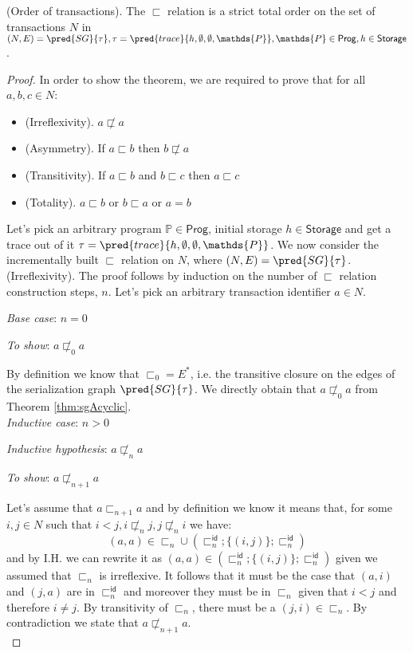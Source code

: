 \begin{thm}
	\label{thm:totOrder}
	(Order of transactions).
	The $\sqsubset$ relation is a strict total order on the set of transactions $N$ in $(N, E) = \pred{SG}{\tau}, \tau = \pred{trace}{h, \emptyset, \emptyset, \mathds{P}}, \mathds{P} \in \mathsf{Prog}, h \in \mathsf{Storage}$.

	\begin{proof}
	In order to show the theorem, we are required to prove that for all $a, b, c \in N$:
	\begin{itemize}
		\item (Irreflexivity). $a \not\sqsubset a$
		\item (Asymmetry). If $a \sqsubset b$ then $b \not\sqsubset a$
		\item (Transitivity). If $a \sqsubset b$ and $b \sqsubset c$ then $a \sqsubset c$
		\item (Totality). $a \sqsubset b$ or $b \sqsubset a$ or $a = b$
	\end{itemize}
	
	Let's pick an arbitrary program $\mathds{P} \in \mathsf{Prog}$, initial storage $h \in \mathsf{Storage}$ and get a trace out of it $\tau = \pred{trace}{h, \emptyset, \emptyset, \mathds{P}}$. We now consider the incrementally built $\sqsubset$ relation on $N$, where $(N, E) = \pred{SG}{\tau}$. \\
	
	(Irreflexivity). The proof follows by induction on the number of $\sqsubset$ relation construction steps, $n$. Let's pick an arbitrary transaction identifier $a \in N$.
	
	{\parindent0pt
	\textit{Base case}: $n = 0$
	
	\textit{To show}: $a \not\sqsubset_0 a$
	
	By definition we know that $\sqsubset_0 = E^*$, i.e. the transitive closure on the edges of the serialization graph $\pred{SG}{\tau}$. We directly obtain that $a \not\sqsubset_0 a$ from Theorem \ref{thm:sgAcyclic}. \\
	
	\textit{Inductive case}: $n > 0$
	
	\textit{Inductive hypothesis}: $a \not\sqsubset_n a$
	
	\textit{To show}: $a \not\sqsubset_{n+1} a$
	
	Let's assume that $a \sqsubset_{n+1} a$ and by definition we know it means that, for some $i, j \in N$ such that $i < j, i \not\sqsubset_n j, j \not\sqsubset_n i$ we have:
	\[
		(a, a) \in \sqsubset_n \cup \left( \sqsubset_n^\mathsf{id} ; \{ (i, j) \} ; \sqsubset_n ^\mathsf{id} \right)
	\]
	and by I.H. we can rewrite it as $(a, a) \in \left( \sqsubset_n^\mathsf{id} ; \{ (i, j) \} ; \sqsubset_n ^\mathsf{id} \right)$ given we assumed that $\sqsubset_n$ is irreflexive. It follows that it must be the case that $(a, i)$ and $(j, a)$ are in $\sqsubset_n^\mathsf{id}$ and moreover they must be in $\sqsubset_n$ given that $i < j$ and therefore $i \neq j$. By transitivity of $\sqsubset_n$, there must be a $(j, i) \in \sqsubset_n$. By contradiction we state that $a \not\sqsubset_{n+1} a$. \\
	}
	

\end{proof}
\end{thm}
